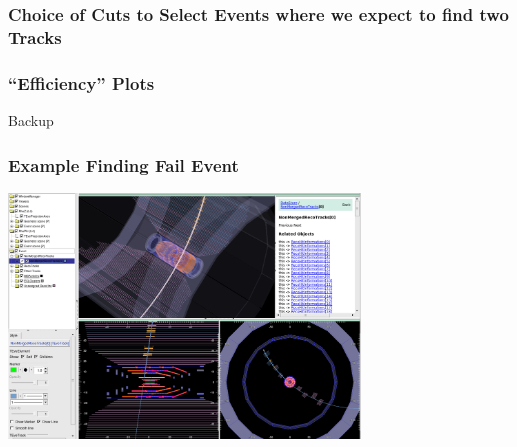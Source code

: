 \documentclass[18pt]{beamer}
\begin{document}
\begin{frame}
  \frametitle{Choice of Cuts to Select Events where we expect to find two Tracks}
  
\end{frame}

\begin{frame}
  \frametitle{``Efficiency'' Plots}
  
\end{frame}


\appendix
\backupbegin

\begin{frame}
  \begin{center}
    \huge Backup
  \end{center}
\end{frame}

  \begin{frame}
  \begin{center}
    \frametitle{Example Finding Fail Event}
    \includegraphics[width=0.7\textwidth]{figures/b2display_screenshots/b2display_example_1trackevt.png}
  \end{center}
\end{frame}
\end{document}
